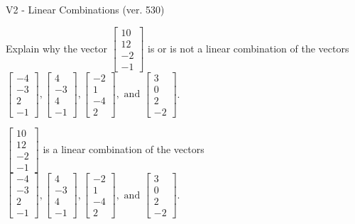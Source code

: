 \begin{exercise}
  \begin{exerciseTitle}V2 - Linear Combinations (ver. 530)\end{exerciseTitle}
  \begin{exerciseStatement}
    Explain why the vector \(\left[\begin{array}{c}
10 \\
12 \\
-2 \\
-1
\end{array}\right]\)  is or is not a linear 
	combination of the vectors \(\left[\begin{array}{c}
-4 \\
-3 \\
2 \\
-1
\end{array}\right] , \left[\begin{array}{c}
4 \\
-3 \\
4 \\
-1
\end{array}\right] , \left[\begin{array}{c}
-2 \\
1 \\
-4 \\
2
\end{array}\right] , \text{ and } \left[\begin{array}{c}
3 \\
0 \\
2 \\
-2
\end{array}\right]\).
	


  \end{exerciseStatement}
  \begin{exerciseAnswer}
   \(\left[\begin{array}{c}
10 \\
12 \\
-2 \\
-1
\end{array}\right]\) 
  	 is  
	a linear combination of the vectors \(\left[\begin{array}{c}
-4 \\
-3 \\
2 \\
-1
\end{array}\right] , \left[\begin{array}{c}
4 \\
-3 \\
4 \\
-1
\end{array}\right] , \left[\begin{array}{c}
-2 \\
1 \\
-4 \\
2
\end{array}\right] , \text{ and } \left[\begin{array}{c}
3 \\
0 \\
2 \\
-2
\end{array}\right]\).


\end{exerciseAnswer}
\end{exercise}
